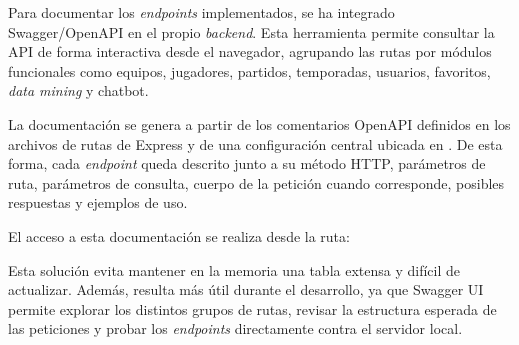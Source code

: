 Para documentar los \textit{endpoints} implementados, se ha integrado Swagger/OpenAPI en el propio \textit{backend}. Esta herramienta permite consultar la API de forma interactiva desde el navegador, agrupando las rutas por módulos funcionales como equipos, jugadores, partidos, temporadas, usuarios, favoritos, \textit{data mining} y chatbot.

La documentación se genera a partir de los comentarios OpenAPI definidos en los archivos de rutas de Express y de una configuración central ubicada en . De esta forma, cada \textit{endpoint} queda descrito junto a su método HTTP, parámetros de ruta, parámetros de consulta, cuerpo de la petición cuando corresponde, posibles respuestas y ejemplos de uso.

El acceso a esta documentación se realiza desde la ruta:

\begin{center}
\end{center}

Esta solución evita mantener en la memoria una tabla extensa y difícil de actualizar. Además, resulta más útil durante el desarrollo, ya que Swagger UI permite explorar los distintos grupos de rutas, revisar la estructura esperada de las peticiones y probar los \textit{endpoints} directamente contra el servidor local.





